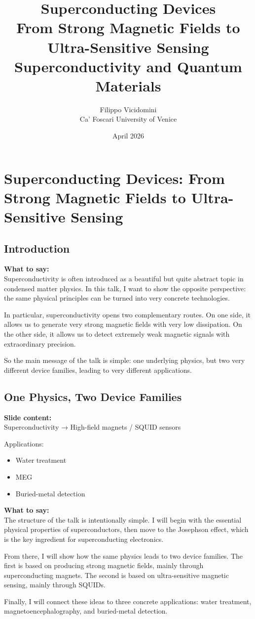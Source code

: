 \documentclass[11pt,a4paper]{article}
\title{ \huge Superconducting Devices\\ \vspace{0.3cm}
\large From Strong Magnetic Fields to Ultra-Sensitive Sensing
\small \\  \vspace{0.3cm} Superconductivity and Quantum Materials}
\author{Filippo Vicidomini\\ Ca' Foscari University of Venice }
\date{April 2026}
\newcommand{\points}[1]{{\color{accent}\textbf{Slide content:}}\\#1}
\newcommand{\speech}[1]{{\color{accent}\textbf{What to say:}}\\#1}
\begin{document}
\maketitle


\tableofcontents


\newpage


\section{Superconducting Devices: From Strong Magnetic Fields to Ultra-Sensitive Sensing}
\subsection{Introduction}


\speech{
Superconductivity is often introduced as a beautiful but quite abstract topic in condensed matter physics. In this talk, I want to show the opposite perspective: the same physical principles can be turned into very concrete technologies.

In particular, superconductivity opens two complementary routes. On one side, it allows us to generate very strong magnetic fields with very low dissipation. On the other side, it allows us to detect extremely weak magnetic signals with extraordinary precision.

So the main message of the talk is simple: one underlying physics, but two very different device families, leading to very different applications.
}


\subsection{One Physics, Two Device Families}

\points{
Superconductivity → High-field magnets / SQUID sensors

Applications:
\begin{itemize}
\item Water treatment
\item MEG
\item Buried-metal detection
\end{itemize}
}

\speech{
The structure of the talk is intentionally simple. I will begin with the essential physical properties of superconductors, then move to the Josephson effect, which is the key ingredient for superconducting electronics.

From there, I will show how the same physics leads to two device families. The first is based on producing strong magnetic fields, mainly through superconducting magnets. The second is based on ultra-sensitive magnetic sensing, mainly through SQUIDs.

Finally, I will connect these ideas to three concrete applications: water treatment, magnetoencephalography, and buried-metal detection.
}
\end{document}
